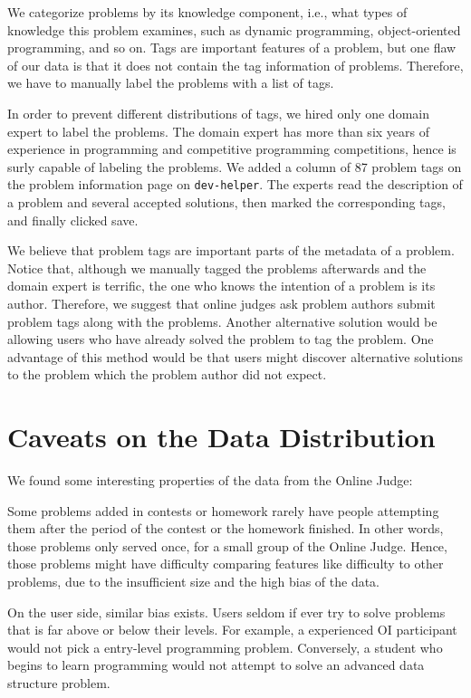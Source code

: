     We categorize problems by its knowledge component, i.e., what types of knowledge this problem examines,
    such as dynamic programming, object-oriented programming, and so on.
    Tags are important features of a problem,
    but one flaw of our data is that it does not contain the tag information of problems.
    Therefore, we have to manually label the problems with a list of tags.

    In order to prevent different distributions of tags, we hired only one domain expert to label the problems.
    The domain expert has more than six years of experience in programming and competitive programming competitions,
    hence is surly capable of labeling the problems.
    We added a column of 87 problem tags on the problem information page on \texttt{dev-helper}.
    The experts read the description of a problem and several accepted solutions,
    then marked the corresponding tags, and finally clicked save.

    We believe that problem tags are important parts of the metadata of a problem.
    Notice that, although we manually tagged the problems afterwards and the domain expert is terrific,
    the one who knows the intention of a problem is its author.
    Therefore, we suggest that online judges ask problem authors submit problem tags along with the problems.
    Another alternative solution would be allowing users who have already solved the problem to tag the problem.
    One advantage of this method would be that users might discover alternative solutions to the problem
    which the problem author did not expect.

\section{Caveats on the Data Distribution}

    We found some interesting properties of the data from the Online Judge:

    Some problems added in contests or homework rarely have people attempting them
    after the period of the contest or the homework finished.
    In other words, those problems only served once, for a small group of the Online Judge.
    Hence, those problems might have difficulty comparing features like difficulty to other problems,
    due to the insufficient size and the high bias of the data.

    On the user side, similar bias exists.
    Users seldom if ever try to solve problems that is far above or below their levels.
    For example, a experienced OI participant would not pick a entry-level programming problem.
    Conversely, a student who begins to learn programming would not
    attempt to solve an advanced data structure problem.

